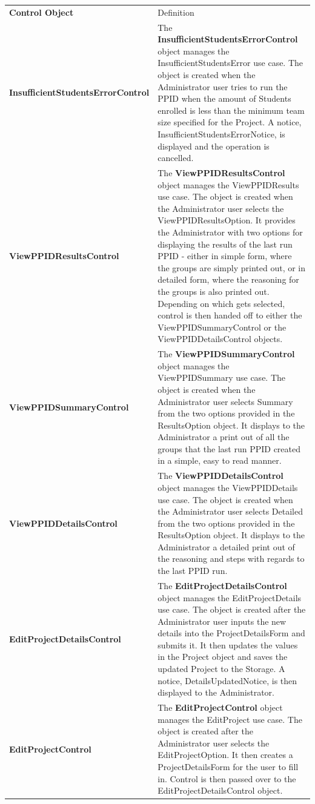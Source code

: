 \documentclass[12pt,letterpaper]{article}
\begin{document}
\begin{center}
\begin{tabu} to 
		\tableheader{}Control Object & Definition\\
		InsufficientStudentsErrorControl & 
			The {\bf InsufficientStudentsErrorControl} object manages the InsufficientStudentsError use case. The object is created when the Administrator user
			tries to run the PPID when the amount of Students enrolled is less than the minimum team size specified for the Project. A notice, InsufficientStudentsErrorNotice,
			is displayed and the operation is cancelled.\\
		ViewPPIDResultsControl & 
			The {\bf ViewPPIDResultsControl} object manages the ViewPPIDResults use case. The object is created when the Administrator user selects the
			ViewPPIDResultsOption. It provides the Administrator with two options for displaying the results of the last run PPID - either in simple form, where the
			groups are simply printed out, or in detailed form, where the reasoning for the groups is also printed out. Depending on which gets selected, control is then
			handed off to either the ViewPPIDSummaryControl or the ViewPPIDDetailsControl objects.\\
		ViewPPIDSummaryControl & 
			The {\bf ViewPPIDSummaryControl} object manages the ViewPPIDSummary use case. The object is created when the Administrator user selects Summary from the
			two options provided in the ResultsOption object. It displays to the Administrator a print out of all the groups that the last run PPID created in a simple, easy to
			read manner.\\
		ViewPPIDDetailsControl & 
			The {\bf ViewPPIDDetailsControl} object manages the ViewPPIDDetails use case. The object is created when the Administrator user selects Detailed from the two 
			options provided in the ResultsOption object. It displays to the Administrator a detailed print out of the reasoning and steps with regards to the last PPID run.\\
		EditProjectDetailsControl & 
			The {\bf EditProjectDetailsControl} object manages the EditProjectDetails use case. The object is created after the Administrator user inputs the new details into
			the ProjectDetailsForm and submits it. It then updates the values in the Project object and saves the updated Project to the Storage. A notice, DetailsUpdatedNotice,
			is then displayed to the Administrator.\\
		EditProjectControl & 
			The {\bf EditProjectControl} object manages the EditProject use case. The object is created after the Administrator user selects the EditProjectOption. It then
			creates a ProjectDetailsForm for the user to fill in. Control is then passed over to the EditProjectDetailsControl object.\\
\end{tabu}
\end{center}
\end{document}
